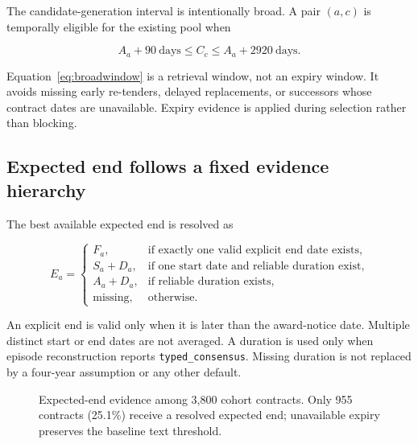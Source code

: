 \documentclass[11pt,a4paper]{article}
\newcommand{\code}[1]{\texttt{\small #1}}
\begin{document}
The candidate-generation interval is intentionally broad. A pair $(a,c)$ is
temporally eligible for the existing pool when

\begin{equation}
  A_a+90\ \text{days} \le C_c \le A_a+2920\ \text{days}.
  \label{eq:broadwindow}
\end{equation}

Equation~\ref{eq:broadwindow} is a retrieval window, not an expiry window. It avoids
missing early re-tenders, delayed replacements, or successors whose contract dates
are unavailable. Expiry evidence is applied during selection rather than blocking.

\subsection{Expected end follows a fixed evidence hierarchy}

The best available expected end is resolved as

\begin{equation}
E_a =
\begin{cases}
F_a, & \text{if exactly one valid explicit end date exists},\\
S_a + D_a, & \text{if one start date and reliable duration exist},\\
A_a + D_a, & \text{if reliable duration exists},\\
\text{missing}, & \text{otherwise}.
\end{cases}
\label{eq:enddate}
\end{equation}

An explicit end is valid only when it is later than the award-notice date. Multiple
distinct start or end dates are not averaged. A duration is used only when episode
reconstruction reports \code{typed\_consensus}. Missing duration is not replaced by
a four-year assumption or any other default.

\begin{figure}[H]
\centering
{}
\caption{Expected-end evidence among 3,800 cohort contracts. Only 955 contracts
(25.1\%) receive a resolved expected end; unavailable expiry preserves the baseline
text threshold.}
\label{fig:expirysources}
\end{figure}
\end{document}
